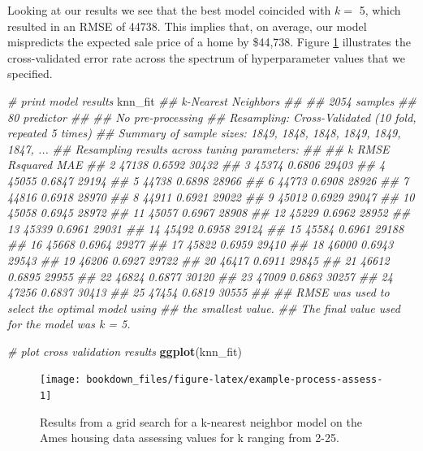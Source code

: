 \documentclass[]{krantz}
\makeatletter
\newenvironment{Shaded}{\begin{snugshade}}{\end{snugshade}}
\newcommand{\CommentTok}[1]{\textcolor[rgb]{0.37,0.37,0.37}{\textit{#1}}}
\newcommand{\KeywordTok}[1]{\textcolor[rgb]{0.27,0.27,0.27}{\textbf{#1}}}
\newcommand{\NormalTok}[1]{#1}
\newenvironment{kframe}{%
\medskip{}
\setlength{\fboxsep}{.8em}
 \def\at@end@of@kframe{}%
 \ifinner\ifhmode%
  \def\at@end@of@kframe{\end{minipage}}%
  \begin{minipage}{\columnwidth}%
 \fi\fi%
 \def\FrameCommand##1{\hskip\@totalleftmargin \hskip-\fboxsep
 \colorbox{shadecolor}{##1}\hskip-\fboxsep
     \hskip-\linewidth \hskip-\@totalleftmargin \hskip\columnwidth}%
 \MakeFramed {\advance\hsize-\width
   \@totalleftmargin\z@ \linewidth\hsize
   \@setminipage}}%
 {\par\unskip\endMakeFramed%
 \at@end@of@kframe}
\renewenvironment{Shaded}{\begin{kframe}}{\end{kframe}}
\makeatother
\begin{document}
Looking at our results we see that the best model coincided with \(k=\) 5, which resulted in an RMSE of 44738. This implies that, on average, our model mispredicts the expected sale price of a home by \$44,738. Figure \ref{fig:example-process-assess} illustrates the cross-validated error rate across the spectrum of hyperparameter values that we specified.

\begin{Shaded}
\begin{Highlighting}[]
\CommentTok{# print model results}
\NormalTok{knn_fit}
\CommentTok{## k-Nearest Neighbors }
\CommentTok{## }
\CommentTok{## 2054 samples}
\CommentTok{##   80 predictor}
\CommentTok{## }
\CommentTok{## No pre-processing}
\CommentTok{## Resampling: Cross-Validated (10 fold, repeated 5 times) }
\CommentTok{## Summary of sample sizes: 1849, 1848, 1848, 1849, 1849, 1847, ... }
\CommentTok{## Resampling results across tuning parameters:}
\CommentTok{## }
\CommentTok{##   k   RMSE   Rsquared  MAE  }
\CommentTok{##    2  47138  0.6592    30432}
\CommentTok{##    3  45374  0.6806    29403}
\CommentTok{##    4  45055  0.6847    29194}
\CommentTok{##    5  44738  0.6898    28966}
\CommentTok{##    6  44773  0.6908    28926}
\CommentTok{##    7  44816  0.6918    28970}
\CommentTok{##    8  44911  0.6921    29022}
\CommentTok{##    9  45012  0.6929    29047}
\CommentTok{##   10  45058  0.6945    28972}
\CommentTok{##   11  45057  0.6967    28908}
\CommentTok{##   12  45229  0.6962    28952}
\CommentTok{##   13  45339  0.6961    29031}
\CommentTok{##   14  45492  0.6958    29124}
\CommentTok{##   15  45584  0.6961    29188}
\CommentTok{##   16  45668  0.6964    29277}
\CommentTok{##   17  45822  0.6959    29410}
\CommentTok{##   18  46000  0.6943    29543}
\CommentTok{##   19  46206  0.6927    29722}
\CommentTok{##   20  46417  0.6911    29845}
\CommentTok{##   21  46612  0.6895    29955}
\CommentTok{##   22  46824  0.6877    30120}
\CommentTok{##   23  47009  0.6863    30257}
\CommentTok{##   24  47256  0.6837    30413}
\CommentTok{##   25  47454  0.6819    30555}
\CommentTok{## }
\CommentTok{## RMSE was used to select the optimal model using}
\CommentTok{##  the smallest value.}
\CommentTok{## The final value used for the model was k = 5.}

\CommentTok{# plot cross validation results}
\KeywordTok{ggplot}\NormalTok{(knn_fit)}
\end{Highlighting}
\end{Shaded}

\begin{figure}

{\centering \texttt{[image: bookdown\_files/figure-latex/example-process-assess-1]} 

}

\caption{Results from a grid search for a k-nearest neighbor model on the Ames housing data assessing values for k ranging from 2-25.}\label{fig:example-process-assess}
\end{figure}
\end{document}
